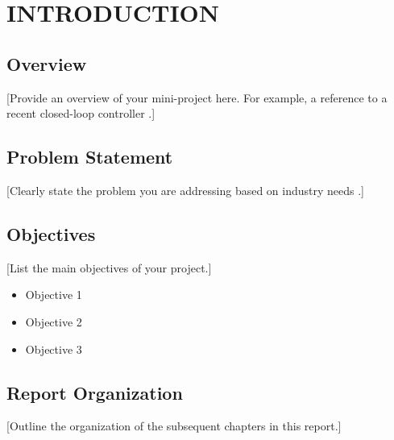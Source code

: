 \chapter{INTRODUCTION}
\label{chap:intro}

\section{Overview}
[Provide an overview of your mini-project here. For example, a reference to a recent closed-loop controller \cite{rajesh2024closed}.]

\section{Problem Statement}
[Clearly state the problem you are addressing based on industry needs \cite{liu2019industrial}.]

\section{Objectives}
[List the main objectives of your project.]
\begin{itemize}
    \item Objective 1
    \item Objective 2
    \item Objective 3
\end{itemize}

\section{Report Organization}
[Outline the organization of the subsequent chapters in this report.]
